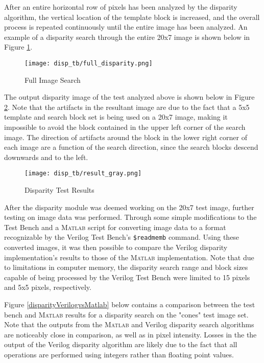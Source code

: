 \par
After an entire horizontal row of pixels has been analyzed by the disparity algorithm, the vertical location of the template block is increased, and the overall process is repeated continuously until the entire image has been analyzed. An example of a disparity search through the entire 20x7 image is shown below in Figure \ref{disparityFullSearch}.
\par
\begin{figure}[H]
	\centerline{\texttt{[image: disp\_tb/full\_disparity.png]}}
	\caption{Full Image Search}
	\label{disparityFullSearch}
\end{figure}
\par
The output disparity image of the test analyzed above is shown below in Figure \ref{disparityTestResults}. Note that the artifacts in the resultant image are due to the fact that a 5x5 template and search block set is being used on a 20x7 image, making it impossible to avoid the block contained in the upper left corner of the search image. The direction of artifacts around the block in the lower right corner of each image are a function of the search direction, since the search blocks descend downwards and to the left.
\par
\begin{figure}[H]
	\centerline{\texttt{[image: disp\_tb/result\_gray.png]}}
	\caption{Disparity Test Results}
	\label{disparityTestResults}
\end{figure}
\par
After the disparity module was deemed working on the 20x7 test image, further testing on image data was performed. Through some simple modifications to the Test Bench and a  \textsc{Matlab} script for converting image data to a format recognizable by the Verilog Test Bench's \texttt{\$readmemb} command. Using these converted images, it was then possible to compare the Verilog disparity implementation's results to those of the \textsc{Matlab} implementation. Note that due to limitations in computer memory, the disparity search range and block sizes capable of being processed by the Verilog Test Bench were limited to 15 pixels and 5x5 pixels, respectively. 
\par
Figure \ref{disparityVerilogvsMatlab} below contains a comparison between the test bench and \textsc{Matlab} results for a disparity search on the "cones" test image set. Note that the outputs from the \textsc{Matlab} and Verilog disparity search algorithms are noticeably close in comparison, as well as in pixel intensity. Losses in the the output of the Verilog disparity algorithm are likely due to the fact that all operations are performed using integers rather than floating point values.

